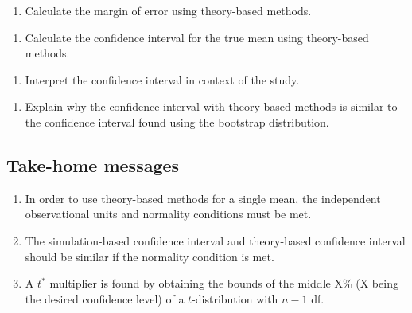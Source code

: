 \documentclass[
]{report}
\providecommand{\tightlist}{%
  \setlength{\itemsep}{0pt}\setlength{\parskip}{0pt}}
\begin{document}
\begin{enumerate}
\def\labelenumi{\arabic{enumi}.}
\setcounter{enumi}{4}
\tightlist
\item
  Calculate the margin of error using theory-based methods.
\end{enumerate}

\vspace{0.6in}

\begin{enumerate}
\def\labelenumi{\arabic{enumi}.}
\setcounter{enumi}{5}
\tightlist
\item
  Calculate the confidence interval for the true mean using theory-based methods.
\end{enumerate}

\vspace{0.6in}

\begin{enumerate}
\def\labelenumi{\arabic{enumi}.}
\setcounter{enumi}{6}
\tightlist
\item
  Interpret the confidence interval in context of the study.
\end{enumerate}

\vspace{1in}

\begin{enumerate}
\def\labelenumi{\arabic{enumi}.}
\setcounter{enumi}{7}
\tightlist
\item
  Explain why the confidence interval with theory-based methods is similar to the confidence interval found using the bootstrap distribution.
\end{enumerate}

\vspace{1in}

\subsection{Take-home messages}\label{take-home-messages-13}

\begin{enumerate}
\def\labelenumi{\arabic{enumi}.}
\item
  In order to use theory-based methods for a single mean, the independent observational units and normality conditions must be met.
\item
  The simulation-based confidence interval and theory-based confidence interval should be similar if the normality condition is met.
\item
  A \(t^*\) multiplier is found by obtaining the bounds of the middle X\% (X being the desired confidence level) of a \(t\)-distribution with \(n - 1\) df.
\end{enumerate}
\end{document}
